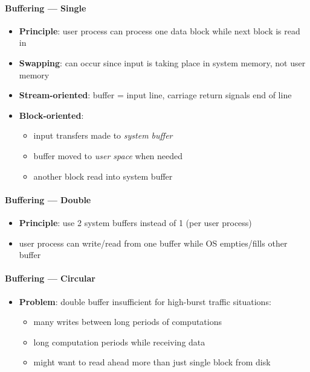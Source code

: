 \paragraph{Buffering --- Single}
\begin{itemize}
  \item \textbf{Principle}: user process can process one data block while next block is read in
  \item \textbf{Swapping}: can occur since input is taking place in system memory, not user memory
  \item \textbf{Stream-oriented}: buffer = input line, carriage return signals end of line
  \item \textbf{Block-oriented}:
  \begin{itemize}
    \item input transfers made to \emph{system buffer} 
    \item buffer moved to \emph{user space} when needed 
    \item another block read into system buffer
  \end{itemize}
\end{itemize}

\paragraph{Buffering --- Double}
\begin{itemize}
  \item \textbf{Principle}: use 2 system buffers instead of 1 (per user process)
  \item user process can write/read from one buffer while OS empties/fills other buffer
\end{itemize}

\paragraph{Buffering --- Circular}
\begin{itemize}
  \item \textbf{Problem}: double buffer insufficient for high-burst traffic situations: 
  \begin{itemize}
    \item many writes between long periods of computations 
    \item long computation periods while receiving data 
    \item might want to read ahead more than just single block from disk
  \end{itemize}
\end{itemize}